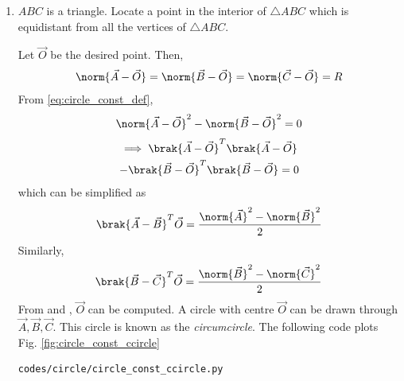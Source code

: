 \renewcommand{\theequation}{\theenumi}
\begin{enumerate}[label=\arabic*.,ref=\thesubsection.\theenumi]
%
%
\item $ABC$ is a triangle. Locate a point in the interior of $\triangle  ABC$ which is equidistant from all the vertices of $\triangle  ABC$.

\solution Let $\vec{O}$ be the desired point.  Then,
\begin{align}
\label{eq:circle_const_def}
\norm{\vec{A}-\vec{O}} = \norm{\vec{B}-\vec{O}} = 
\norm{\vec{C}-\vec{O}} = R
\end{align}
From \eqref{eq:circle_const_def},
\begin{align}
\label{eq:circle_const_AB}
\norm{\vec{A}-\vec{O}}^2 - \norm{\vec{B}-\vec{O}}^2  = 0
\end{align}
\begin{multline}
\implies \brak{\vec{A}-\vec{O}}^T\brak{\vec{A}-\vec{O}} 
\\
- \brak{\vec{B}-\vec{O}}^T\brak{\vec{B}-\vec{O}} = 0
\end{multline}
%
which can be simplified as
\begin{align}
\label{eq:circle_const_chord_ab}
\brak{\vec{A}-\vec{B}}^T\vec{O} =   \frac{\norm{\vec{A}}^2- \norm{\vec{B}}^2}{2}
\end{align}
Similarly,
\begin{align}
\label{eq:circle_const_chord_bc}
\brak{\vec{B}-\vec{C}}^T\vec{O} =   \frac{\norm{\vec{B}}^2- \norm{\vec{C}}^2}{2}
\end{align}
%
From \label{eq:circle_const_chord_ab} and \label{eq:circle_const_chord_ab}, $\vec{O}$ can be computed.
%
A circle with centre $\vec{O}$ can be drawn through $\vec{A}, \vec{B}, \vec{C}$.  This circle is known as the {\em circumcircle}.  
The following code plots Fig. \ref{fig:circle_const_ccircle}
\begin{lstlisting}
codes/circle/circle_const_ccircle.py
\end{lstlisting}
\begin{figure}[!ht]

\end{figure}
\end{enumerate}
